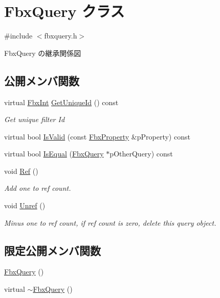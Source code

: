 \hypertarget{class_fbx_query}{}\section{Fbx\+Query クラス}
\label{class_fbx_query}


{\ttfamily \#include $<$fbxquery.\+h$>$}



Fbx\+Query の継承関係図
\subsection*{公開メンバ関数}
\begin{DoxyCompactItemize}
\item 
virtual \hyperlink{fbxtypes_8h_a088fa96de3b0b3ea69f0f6afef525dfb}{Fbx\+Int} \hyperlink{class_fbx_query_ac7daae8f6fa83cd97ae24e93d7b4dc29}{Get\+Unique\+Id} () const
\begin{DoxyCompactList}\small\item\em Get unique filter Id \end{DoxyCompactList}\item 
virtual bool \hyperlink{class_fbx_query_a822776baf45a56d8e126e948ec25d920}{Is\+Valid} (const \hyperlink{class_fbx_property}{Fbx\+Property} \&p\+Property) const
\item 
virtual bool \hyperlink{class_fbx_query_adfc24c7306ceed2fcfd8c67198e0c1dd}{Is\+Equal} (\hyperlink{class_fbx_query}{Fbx\+Query} $\ast$p\+Other\+Query) const
\item 
void \hyperlink{class_fbx_query_a0d945a2be30bcfe72a083f0af90d8252}{Ref} ()
\begin{DoxyCompactList}\small\item\em Add one to ref count. \end{DoxyCompactList}\item 
void \hyperlink{class_fbx_query_a572e8b1922846020818adfbdc2a48f74}{Unref} ()
\begin{DoxyCompactList}\small\item\em Minus one to ref count, if ref count is zero, delete this query object. \end{DoxyCompactList}\end{DoxyCompactItemize}
\subsection*{限定公開メンバ関数}
\begin{DoxyCompactItemize}
\item 
\hyperlink{class_fbx_query_af8e81dde9b528978812388b9dc0d6d60}{Fbx\+Query} ()
\item 
virtual \hyperlink{class_fbx_query_a9e87c2a8fda32a157ed77b998aac954e}{$\sim$\+Fbx\+Query} ()
\end{DoxyCompactItemize}
